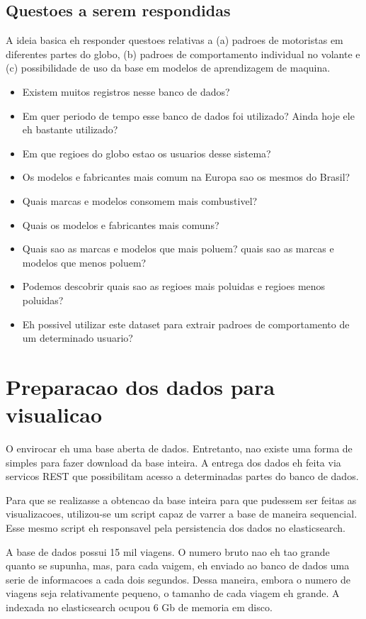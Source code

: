 \documentclass[10pt, conference]{IEEEtran}
\begin{document}
\subsection{Questoes a serem respondidas}

A ideia basica eh responder questoes relativas a (a) padroes de motoristas
em diferentes partes do globo, (b) padroes de comportamento individual no
volante e (c) possibilidade de uso da base em modelos de aprendizagem de maquina.

\begin{itemize}
  \item Existem muitos registros nesse banco de dados?
  \item Em quer periodo de tempo esse banco de dados foi utilizado? Ainda hoje ele eh bastante utilizado?
  \item Em que regioes do globo estao os usuarios desse sistema?
  \item Os modelos e fabricantes mais comum na Europa sao os mesmos do Brasil?
  \item Quais marcas e modelos consomem mais combustivel?
  \item Quais os modelos e fabricantes mais comuns?
  \item Quais sao as marcas e modelos que mais poluem? quais sao as marcas e modelos que menos poluem?
  \item Podemos descobrir quais sao as regioes mais poluidas e regioes menos poluidas?
  \item Eh possivel utilizar este dataset para extrair padroes de comportamento de um determinado usuario?
\end{itemize}


\section{Preparacao dos dados para visualicao}

O envirocar eh uma base aberta de dados. Entretanto, nao existe uma forma de simples 
para fazer download da base inteira. A entrega dos dados eh feita via servicos REST
que possibilitam acesso a determinadas partes do banco de dados.

Para que se realizasse a obtencao da base inteira para que pudessem ser feitas as 
visualizacoes, utilizou-se um script capaz de varrer a base de maneira sequencial. 
Esse mesmo script eh responsavel pela persistencia dos dados no elasticsearch.

A base de dados possui 15 mil viagens. O numero bruto nao eh tao grande quanto se supunha,
mas, para cada vaigem, eh enviado ao banco de dados uma serie de informacoes a cada dois
segundos. Dessa maneira, embora o numero de viagens seja relativamente 
pequeno, o tamanho de cada viagem eh grande. A indexada no elasticsearch 
ocupou 6 Gb de memoria em disco.
\end{document}
